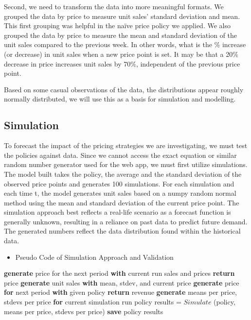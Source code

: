 \documentclass[11pt,a4paper]{article}
\begin{document}
Second, we need to transform the data into more meaningful formats. We grouped the data by price to measure unit sales’ standard deviation and mean. This first grouping was helpful in the naïve price policy we applied. 
We also grouped the data by price to measure the mean and standard deviation of the unit sales compared to the previous week. In other words, what is the \% increase (or decrease) in unit sales when a new price point is set. 
It may be that a 20\% decrease in price increases unit sales by 70\%, independent of the previous price point.

Based on some casual observations of the data, the distributions appear roughly normally distributed, we will use this as a basis for simulation and modelling.

\subsection{Simulation}
To forecast the impact of the pricing strategies we are investigating, we must test the policies against data. 
Since we cannot access the exact equation or similar random number generator used for the web app, we must first utilize simulations. 
The model built takes the policy, the average and the standard deviation of the observed price points and generates 100 simulations. 
For each simulation and each time t, the model generates unit sales based on a numpy random normal method using the mean and standard deviation of the current price point. 
The simulation approach best reflects a real-life scenario as a forecast function is generally unknown, resulting in a reliance on past data to predict future demand. 
The generated numbers reflect the data distribution found within the historical data.
\pagebreak

\begin{itemize}[leftmargin=*]
    \item Pseudo Code of Simulation Approach and Validation
\end{itemize}

\begin{algorithmic}[1]
        \State \textbf{generate} price for the next period \textbf{with} current run sales and prices
        \State \textbf{return} price
    \EndProcedure
    \State
            \State \textbf{generate} unit sales \textbf{with} mean, stdev, and current price
            \State \textbf{generate} price \textbf{for} next period \textbf{with} given policy
        \EndFor
        \State \textbf{return} revenue
    \EndProcedure 
    \State
            \State \textbf{generate} means per price, stdevs per price \textbf{for} current simulation run 
            \State policy results = $Simulate$ (policy, means per price, stdevs per price) 
            \State \textbf{save} policy results
        \EndFor
    \EndFor
\end{algorithmic}
\end{document}
